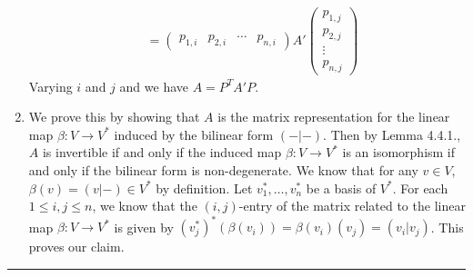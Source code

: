\documentclass[a4paper, 12pt]{article}
\begin{document}
\begin{enumerate}[(1)]
\begin{align*}
			&=\begin{pmatrix}
				p_{1,i}&p_{2,i}&\cdots&p_{n,i}
			\end{pmatrix}A'\begin{pmatrix}
				p_{1,j}\\ 
				p_{2,j}\\ 
				\vdots\\ 
				p_{n,j}
			\end{pmatrix}
\end{align*}
Varying \(i\) and \(j\) and we have \(A=P^TA'P\).
\item We prove this by showing that \(A\) is the matrix representation for the linear map \(\beta:V\rightarrow V^*\) induced by the bilinear form \((-|-)\). Then by Lemma 4.4.1., \(A\) is invertible if and only if 
the induced map \(\beta:V\rightarrow V^*\) is an isomorphism if and only if the bilinear form is non-degenerate. We know that for any \(v\in V\), \(\beta(v)=(v|-)\in V^*\) by definition. Let \(v_1^*,\ldots,v_n^*\) be a basis 
of \(V^*\). For each \(1\leq i,j\leq n\), we know that the \((i,j)\)-entry of the matrix related to the linear map \(\beta:V\rightarrow V^*\) is given by \((v_j^*)^*(\beta(v_i))=\beta(v_i)(v_j)=(v_i|v_j)\). This proves our claim.
\end{enumerate}
\noindent\rule{7in}{2.8pt}
\end{document}
